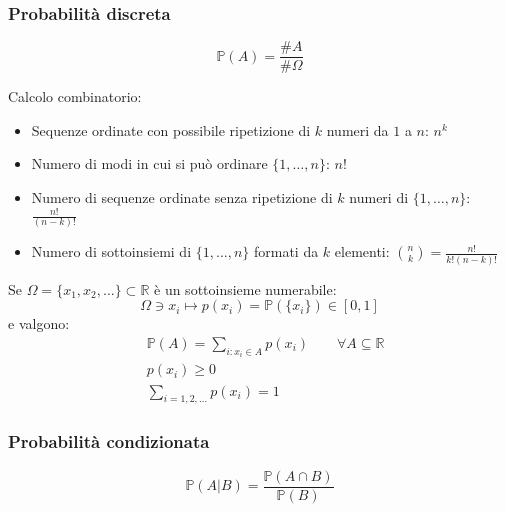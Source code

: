 \subsubsection{Probabilità discreta}
\begin{definition}[Probabilità]
	\begin{equation}
		\mathbb{P}(A) = \frac{\# A}{\# \Omega}
	\end{equation}
\end{definition}
\begin{proposition}
	Calcolo combinatorio:
	\begin{itemize}
		\item Sequenze ordinate con possibile ripetizione di $k$ numeri da $1$ a $n$: $n^k$
		\item Numero di modi in cui si può ordinare $\{1, \ldots, n\}$: $n!$
		\item Numero di sequenze ordinate senza ripetizione di $k$ numeri di $\{1, \ldots, n\}$: $\frac{n!}{(n-k)!}$
		\item Numero di sottoinsiemi di $\{1, \ldots, n\}$ formati da $k$ elementi: $\binom{n}{k} = \frac{n!}{k!(n-k)!}$
	\end{itemize}
\end{proposition}

\begin{definition}
	Se $\Omega=\{x_1,x_2,\ldots\} \subset \mathbb{R}$ è un sottoinsieme numerabile:
	\begin{equation}
		\Omega \ni x_i \mapsto p(x_i) = \mathbb{P}(\{x_i\}) \in [0,1]
	\end{equation}
	e valgono:
	\begin{align}
		& \mathbb{P}(A) = \sum_{i : x_i \in A} p(x_i) \quad\quad \forall A \subseteq \mathbb{R} \\
		& p(x_i) \geq 0 \\
		& \sum_{i=1,2,\ldots} p(x_i) = 1
	\end{align}
\end{definition}

\subsubsection{Probabilità condizionata}
\begin{definition}
	\begin{equation}
		\mathbb{P}(A \vert B) = \frac{\mathbb{P}(A \cap B)}{\mathbb{P}(B)}
	\end{equation}
\end{definition}

